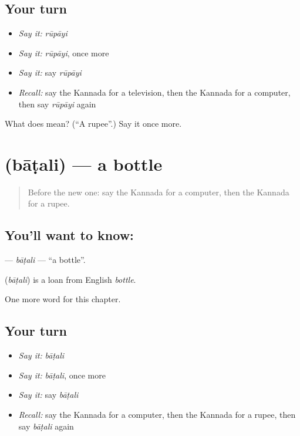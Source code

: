 \subsection*{Your turn}
\begin{itemize}
\raggedright
  \item \emph{Say it:} \emph{rūpāyi}
  \item \emph{Say it:} \emph{rūpāyi}, once more
  \item \emph{Say it:} say \emph{rūpāyi}
  \item \emph{Recall:} say the Kannada for a television, then the Kannada for a computer, then say \emph{rūpāyi} again
\end{itemize}

\begin{tcolorbox}[breakable,colback=teal!4,colframe=teal!35!black,title={Before you move on}]
What does  mean? (\textquotedblleft{}A rupee\textquotedblright{}.) Say it once more.
\end{tcolorbox}
\section[\texorpdfstring{\kn{ಬಾಟಲಿ} (bāṭali)}{ಬಾಟಲಿ (bāṭali)}]{ (bāṭali) — a bottle}

\label{lesson:KA-C138-batali}



\begin{quote}
Before the new one: say the Kannada for a computer, then the Kannada for a rupee.
\end{quote}

\subsection*{You'll want to know: }
\textbf{} — \emph{bāṭali} — \textquotedblleft{}a bottle\textquotedblright{}.

\begin{cousinweb}
\textbf{} (\emph{bāṭali}) is a loan from English \emph{bottle}.
\end{cousinweb}

\begin{grammarlens}[title={What you've built}]
One more word for this chapter.
\end{grammarlens}

\subsection*{Your turn}
\begin{itemize}
\raggedright
  \item \emph{Say it:} \emph{bāṭali}
  \item \emph{Say it:} \emph{bāṭali}, once more
  \item \emph{Say it:} say \emph{bāṭali}
  \item \emph{Recall:} say the Kannada for a computer, then the Kannada for a rupee, then say \emph{bāṭali} again
\end{itemize}

